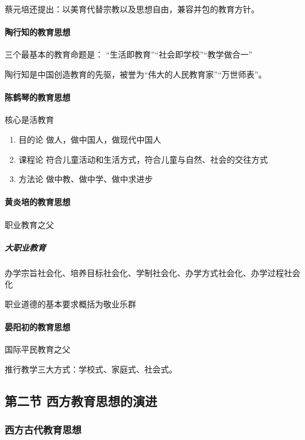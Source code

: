 \documentclass[b5paper,11pt]{article}
\begin{document}
\noindent
蔡元培还提出：\textcolor{ctp-red}{以美育代替宗教}以及\textcolor{ctp-red}{思想自由，兼容并包}的教育方针。

\paragraph{陶行知的教育思想} 三个最基本的教育命题是：
\textcolor{ctp-red}{“生活即教育”“社会即学校”“教学做合一”}

\noindent
\textcolor{ctp-red}{陶行知是中国创造教育的先驱}，被誉为“伟大的人民教育家”“万世师表”。

\paragraph{陈鹤琴的教育思想} 核心是\textcolor{ctp-red}{活教育}
\begin{enumerate}
  \item \textcolor{ctp-red}{目的论} 做人，做中国人，做现代中国人
  \item \textcolor{ctp-red}{课程论} 符合儿童活动和生活方式，符合儿童与自然、社会的交往方式
  \item \textcolor{ctp-red}{方法论} 做中教、做中学、做中求进步
\end{enumerate}

\paragraph{黄炎培的教育思想} \textcolor{ctp-red}{职业教育之父}

\subparagraph{大职业教育} \textcolor{ctp-maroon}{办学宗旨社会化、培养目标社会化、学制社会化、办学方式社会化、办学过程社会化}

职业道德的基本要求概括为\textcolor{ctp-red}{敬业乐群}

\paragraph{晏阳初的教育思想} \textcolor{ctp-red}{国际平民教育之父}

推行教学\textcolor{ctp-red}{三大方式}：学校式、家庭式、社会式。

\subsection{第二节 西方教育思想的演进}
\subsubsection{西方古代教育思想}
\end{document}
